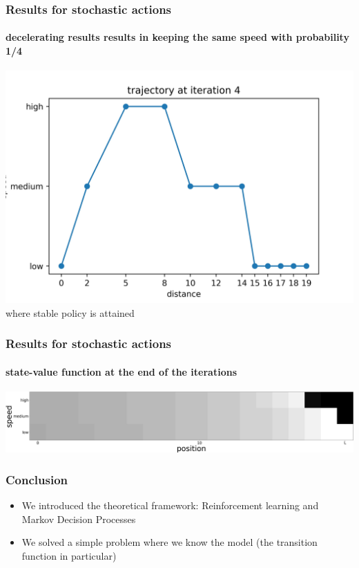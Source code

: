 \documentclass[dvipsnames,svgnames]{beamer}
\begin{document}
\begin{frame}
\frametitle{Results for stochastic actions}
\framesubtitle{decelerating results results in keeping the same speed with probability 1/4}
\centering
\includegraphics[scale=0.5]{img/trajectory4.jpg}\\
\centering
where stable policy is attained 
\end{frame}


\begin{frame}
\frametitle{Results for stochastic actions}
\framesubtitle{state-value function at the end of the iterations
}
\centering
\includegraphics[scale=0.7]{img/state_values_sto.jpg}
\end{frame}




\begin{frame}
\frametitle{Conclusion }
\begin{block}{}
\begin{itemize}
\item We introduced the theoretical framework: Reinforcement learning and Markov Decision Processes
\item We solved a simple problem where we know the model (the transition function in particular)
\end{itemize}
\end{block}
\end{frame}
\end{document}
